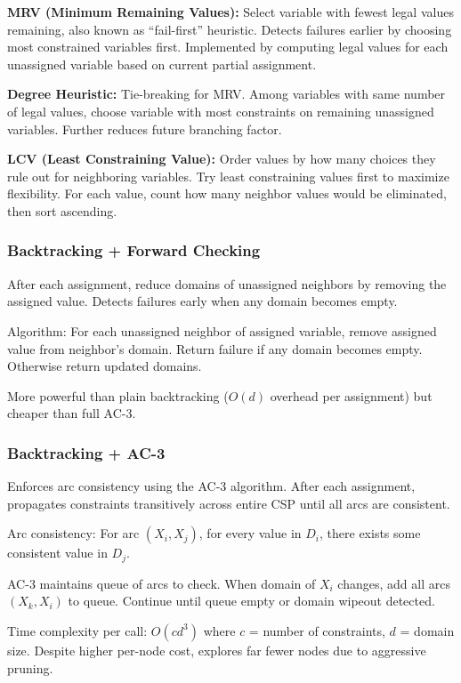 \documentclass[letterpaper]{article}
\begin{document}
\textbf{MRV (Minimum Remaining Values):} Select variable with fewest legal values remaining, also known as ``fail-first'' heuristic. Detects failures earlier by choosing most constrained variables first. Implemented by computing legal values for each unassigned variable based on current partial assignment.

\textbf{Degree Heuristic:} Tie-breaking for MRV. Among variables with same number of legal values, choose variable with most constraints on remaining unassigned variables. Further reduces future branching factor.

\textbf{LCV (Least Constraining Value):} Order values by how many choices they rule out for neighboring variables. Try least constraining values first to maximize flexibility. For each value, count how many neighbor values would be eliminated, then sort ascending.

\subsubsection{Backtracking + Forward Checking}
After each assignment, reduce domains of unassigned neighbors by removing the assigned value. Detects failures early when any domain becomes empty.

Algorithm: For each unassigned neighbor of assigned variable, remove assigned value from neighbor's domain. Return failure if any domain becomes empty. Otherwise return updated domains.

More powerful than plain backtracking ($O(d)$ overhead per assignment) but cheaper than full AC-3.

\subsubsection{Backtracking + AC-3}
Enforces arc consistency using the AC-3 algorithm. After each assignment, propagates constraints transitively across entire CSP until all arcs are consistent.

Arc consistency: For arc $(X_i, X_j)$, for every value in $D_i$, there exists some consistent value in $D_j$.

AC-3 maintains queue of arcs to check. When domain of $X_i$ changes, add all arcs $(X_k, X_i)$ to queue. Continue until queue empty or domain wipeout detected.

Time complexity per call: $O(cd^3)$ where $c$ = number of constraints, $d$ = domain size. Despite higher per-node cost, explores far fewer nodes due to aggressive pruning.
\end{document}
